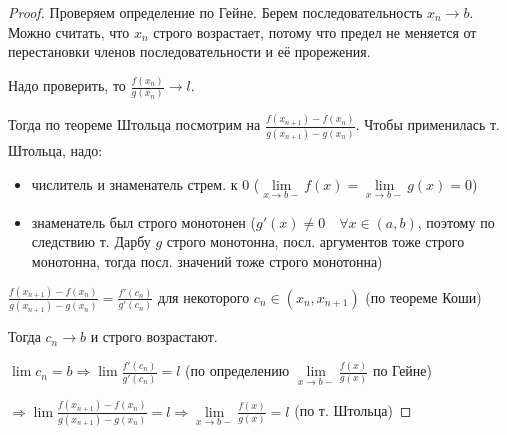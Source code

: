 \begin{proof}
    Проверяем определение по Гейне. Берем последовательность $x_n \longrightarrow b$. Можно считать, что $x_n$ строго возрастает, 
    потому что предел не меняется от перестановки членов последовательности и её прорежения.

    Надо проверить, то $\frac{f(x_n)}{g(x_n)} \longrightarrow l$.

    Тогда по теореме Штольца посмотрим на $\frac{f(x_{n+1}) - f(x_n)}{g(x_{n+1}) - g(x_n)}$. Чтобы применилась т. Штольца, надо:
    \begin{itemize}
        \item числитель и знаменатель стрем. к 0 ($\lim\limits_{x \rightarrow b-} f(x) = \lim\limits_{x \rightarrow b-} g(x) = 0$)
        \item знаменатель был строго монотонен ($g'(x) \neq 0 \quad \forall x \in (a, b)$, 
        поэтому по следствию т. Дарбу $g$ строго монотонна, посл. аргументов тоже строго монотонна, тогда посл. значений тоже строго монотонна)
    \end{itemize}

    $\frac{f(x_{n+1}) - f(x_n)}{g(x_{n+1}) - g(x_n)} = \frac{f'(c_n)}{g'(c_n)}$ для некоторого $c_n \in (x_n, x_{n+1})$ (по теореме Коши)
    

    Тогда $c_n \longrightarrow b$  и строго возрастают.

    $\lim c_n = b \Longrightarrow \lim \frac{f'(c_n)}{g'(c_n)} = l$ (по определению $\lim\limits_{x \rightarrow b-}\frac{f(x)}{g(x)}$ по Гейне)

    $\Longrightarrow \lim \frac{f(x_{n+1}) - f(x_n)}{g(x_{n+1}) - g(x_n)} = l \Longrightarrow \lim\limits_{x \rightarrow b-}\frac{f(x)}{g(x)} = l$ (по т. Штольца)

\end{proof}

